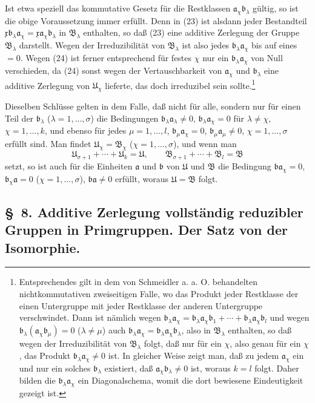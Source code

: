 \documentclass[11pt]{article}
\newcommand{\mB}{\mathfrak{B}}
\newcommand{\ma}{\mathfrak{a}}
\newcommand{\mb}{\mathfrak{b}}
\newcommand{\mx}{\mathfrak{x}}
\providecommand{\mU}{\mathfrak{U}}
\begin{document}
Ist etwa speziell das kommutative Gesetz für die Restklassen $\ma_\chi\mb_\lambda$ gültig, so ist die obige Voraussetzung immer erfüllt. Denn in (23) ist alsdann jeder Bestandteil $\mx\mb_\lambda\ma_\chi=\mx\ma_\chi\mb_\lambda$ in $\mB_\lambda$ enthalten, so daß (23) eine additive Zerlegung der Gruppe $\mB_\lambda$ darstellt. Wegen der Irreduzibilität von $\mB_\lambda$ ist also jedes $\mb_\lambda\ma_\chi$ bis auf eines $=0$. Wegen (24) ist ferner entsprechend für festes $\chi$ nur ein $\mb_\lambda\ma_\chi$ von Null verschieden, da (24) sonst wegen der Vertauschbarkeit von $\ma_\chi$ und $\mb_\lambda$ eine additive Zerlegung von $\mU_\chi$ lieferte, das doch irreduzibel sein sollte.\footnote{Entsprechendes gilt in dem von Schmeidler a. a. O. behandelten nichtkommutativen zweiseitigen Falle, wo das Produkt jeder Restklasse der einen Untergruppe mit jeder Restklasse der anderen Untergruppe verschwindet. Dann ist nämlich wegen $\mb_\lambda\ma_\chi=\mb_\lambda\ma_\chi\mb_1+
\cdots+\mb_\lambda\ma_\chi\mb_l$ und wegen $\mb_\lambda(\ma_\chi\mb_\mu)=0$ ($\lambda\ne\mu$) auch $\mb_\lambda\ma_\chi=\mb_\lambda\ma_\chi\mb_\lambda$, also in $\mB_\lambda$ enthalten, so daß wegen der Irreduzibilität von $\mB_\lambda$ folgt, daß nur für ein $\chi$, also genau für ein $\chi$, das Produkt $\mb_\lambda\ma_\chi\ne0$ ist. In gleicher Weise zeigt man, daß zu jedem $\ma_\chi$ ein und nur ein solches $\mb_\lambda$ existiert, daß $\ma_\chi\mb_\lambda\ne0$ ist, woraus $k=l$ folgt. Daher bilden die $\mb_\lambda\ma_\chi$ ein Diagonalschema, womit die dort bewiesene Eindeutigkeit gezeigt ist.}

Dieselben Schlüsse gelten in dem Falle, daß nicht für alle, sondern nur für einen Teil der $\mb_\lambda$ ($\lambda=1,\ldots,\sigma$) die Bedingungen $\mb_\lambda\ma_\lambda\ne0$, $\mb_\lambda\ma_\chi=0$ für $\lambda\ne\chi$, $\chi=1,\ldots,k$, und ebenso für jedes $\mu=1,\ldots,l$, $\mb_\mu\ma_\chi=0$, $\mb_\mu\ma_\mu\ne0$, $\chi=1,
\ldots,\sigma$ erfüllt sind. Man findet $\mU_\chi=\mB_\chi$ ($\chi=1,
\ldots,\sigma$), und wenn man
\[
 \mU_{\sigma+1}+\cdots+\mU_k=\mU,
 \qquad
 \mB_{\sigma+1}+\cdots+\mB_l=\mB
\]
setzt, so ist auch für die Einheiten $\ma$ und $\mb$ von $\mU$ und $\mB$ die Bedingung $\mb\ma_\chi=0$, $\mb_\chi\ma=0$ ($\chi=1,
\ldots,\sigma$), $\mb\ma\ne0$ erfüllt, woraus $\mU=\mB$ folgt.

\subsection*{\S~8. Additive Zerlegung vollständig reduzibler Gruppen in Primgruppen. Der Satz von der Isomorphie.}
\end{document}
